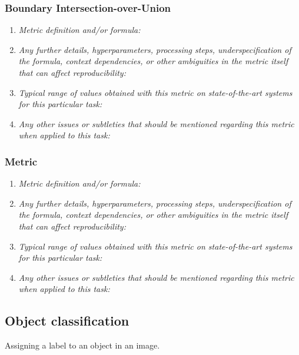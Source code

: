 \documentclass[a4paper,11pt]{article}
\begin{document}
    \subsubsection{Boundary Intersection-over-Union}
        \begin{enumerate}[label=\alph*.]
            \item \textit{Metric definition and/or formula:}
            \bigskip
            \item \textit{Any further details, hyperparameters, processing steps, underspecification of the formula, context dependencies, or other ambiguities in the metric itself that can affect reproducibility:}
            \bigskip
            \item \textit{Typical range of values obtained with this metric on state-of-the-art systems for this particular task:}
            \bigskip
            \item \textit{Any other issues or subtleties that should be mentioned regarding this metric when applied to this task:}
            \bigskip
        \end{enumerate}
    


    \subsubsection{Metric}
        \begin{enumerate}[label=\alph*.]
            \item \textit{Metric definition and/or formula:}
            \bigskip
            \item \textit{Any further details, hyperparameters, processing steps, underspecification of the formula, context dependencies, or other ambiguities in the metric itself that can affect reproducibility:}
            \bigskip
            \item \textit{Typical range of values obtained with this metric on state-of-the-art systems for this particular task:}
            \bigskip
            \item \textit{Any other issues or subtleties that should be mentioned regarding this metric when applied to this task:}
            \bigskip
        \end{enumerate}

    \subsection{Object classification}
        Assigning a label to an object in an image.
\end{document}
